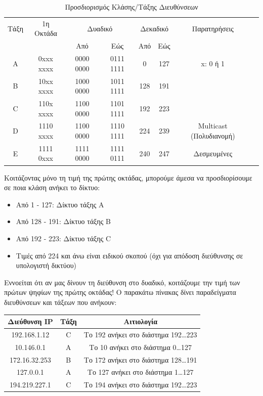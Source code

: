 \begin{table}
\centering
  \begin{tabular}{|c|c|c|c|c|c|c|c|}
    \rowcolor[gray]{0.95}
    \hline
    \multirow{2}{*}{} Τάξη & 1η Οκτάδα & \multicolumn{2}{|c|}{Δυαδικό} & \multicolumn{2}{|c|}{Δεκαδικό} & Παρατηρήσεις \\ 
    \cline{3-6}
     \rowcolor[gray]{0.95}
    & & Από & Εώς & Από & Εώς & \\
    \hline
    A & 0xxx xxxx & 0000 0000 & 0111 1111 & 0 & 127 & x: 0 ή 1\\
    \hline
    Β & 10xx xxxx & 1000 0000 & 1011 1111 & 128 & 191 & \\
    \hline
    C & 110x xxxx & 1100 0000 & 1101 1111 & 192 & 223 & \\
    \hline
    D & 1110 xxxx & 1100 0000 & 1110 1111 & 224 & 239 & Multicast (Πολυδιανομή) \\
    \hline
    E & 1111 0xxx & 1111 0000 & 1111 0111 & 240 & 247 & Δεσμευμένες\\
    \hline 
  \end{tabular}
  
\caption{Προσδιορισμός Κλάσης/Τάξης Διευθύνσεων}
\label{t3-1-2}
\end{table}

Κοιτάζοντας μόνο τη τιμή της πρώτης οκτάδας, μπορούμε άμεσα να προσδιορίσουμε σε ποια κλάση ανήκει το δίκτυο:

\begin{itemize}
\item Από 1 - 127: Δίκτυο τάξης Α
\item Από 128 - 191: Δίκτυο τάξης B
\item Από 192 - 223: Δίκτυο τάξης C
\item Τιμές από 224 και άνω είναι ειδικού σκοπού (όχι για απόδοση διεύθυνσης σε υπολογιστή δικτύου)
\end{itemize}

Εννοείται ότι αν μας δίνουν τη διεύθυνση στο δυαδικό, κοιτάζουμε την τιμή των πρώτων ψηφίων της πρώτης οκτάδας!
Ο παρακάτω πίνακας δίνει παραδείγματα διευθύνσεων και τάξεων που ανήκουν:

\begin{center}
\begin{tabular}{|c|c|c|}
\hline
\rowcolor[gray]{0.95}
Διεύθυνση IP & Τάξη & Αιτιολογία \\
\hline
192.168.1.12 & C & Το 192 ανήκει στο διάστημα 192\ldots223\\
\hline
10.146.0.1 & A & Το 10 ανήκει στο διάστημα 0\ldots127\\
\hline
172.16.32.253 & B & Το 172 ανήκει στο διάστημα 128\ldots191\\
\hline
127.0.0.1 & A & Το 127 ανήκει στο διάστημα 1\ldots127\\
\hline
194.219.227.1 & C & Το 194 ανήκει στο διάστημα 192\ldots223\\
\hline
\end{tabular}
\end{center}

